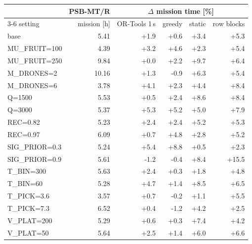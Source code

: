 \begin{tabular}{lrrrrr}
\toprule
 & PSB-MT/R & \multicolumn{4}{c}{$\Delta$ mission time [\%]} \\
\cmidrule(lr){3-6}
setting & mission [h] & OR-Tools 1\,s & greedy & static & row blocks \\
\midrule
base & 5.41 & +1.9 & +0.6 & +3.4 & +5.3 \\
MU\_FRUIT=100 & 4.39 & +3.2 & +4.6 & +2.3 & +5.4 \\
MU\_FRUIT=250 & 9.84 & +0.0 & +2.2 & +9.7 & +6.4 \\
M\_DRONES=2 & 10.16 & +1.3 & -0.9 & +6.3 & +5.4 \\
M\_DRONES=6 & 3.78 & +4.1 & +2.3 & +4.4 & +8.4 \\
Q=1500 & 5.53 & +0.5 & +2.4 & +8.6 & +8.4 \\
Q=3000 & 5.37 & +5.3 & +5.2 & +5.0 & +7.9 \\
REC=0.82 & 5.23 & +2.4 & +2.4 & +5.2 & +5.3 \\
REC=0.97 & 6.09 & +0.7 & +4.8 & +2.8 & +5.2 \\
SIG\_PRIOR=0.3 & 5.24 & +5.4 & +8.8 & +0.5 & +2.3 \\
SIG\_PRIOR=0.9 & 5.61 & -1.2 & -0.4 & +8.4 & +15.5 \\
T\_BIN=300 & 5.63 & +2.4 & +0.3 & +1.8 & +4.8 \\
T\_BIN=60 & 5.28 & +4.7 & +1.4 & +8.5 & +6.5 \\
T\_PICK=3.6 & 3.57 & +0.7 & -0.2 & +1.1 & +5.5 \\
T\_PICK=7.3 & 6.52 & +0.4 & -1.2 & +4.2 & +2.5 \\
V\_PLAT=200 & 5.29 & +0.6 & +0.3 & +7.4 & +4.2 \\
V\_PLAT=50 & 5.64 & +2.5 & +1.4 & +6.0 & +6.6 \\
\bottomrule
\end{tabular}
